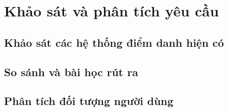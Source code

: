 
\chapter{Khảo sát và phân tích yêu cầu}
\label{ch:khao-sat}


\section{Khảo sát các hệ thống điểm danh hiện có}
\label{sec:khao-sat-he-thong}

\section{So sánh và bài học rút ra}
\label{sec:so-sanh}

\section{Phân tích đối tượng người dùng}
\label{sec:doi-tuong}

